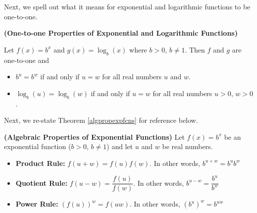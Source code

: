 \documentclass{ximera}
\begin{document}
\smallskip

Next, we spell out what it means for exponential and logarithmic functions to be one-to-one.

\smallskip

\colorbox{ResultColor}{\bbm

\begin{thm}  \label{explogsonetoone} \textbf{(One-to-one Properties of Exponential and Logarithmic Functions)} 

Let $f(x) = b^{x}$ and $g(x) = \log_{b}(x)$ where $b>0$, $b\neq 1$.  Then $f$ and $g$ are one-to-one and  

\vspace{-.1in}

\begin{itemize}

\item  $b^{u} = b^{w}$ if and only if $u=w$ for all real numbers $u$ and $w$.

\item  $\log_{b}(u) = \log_{b}(w)$ if and only if $u=w$ for all real numbers $u > 0$, $w > 0$.

\end{itemize}

\end{thm}

\ebm}

\smallskip


Next, we re-state Theorem \ref{algpropexpfcns} for reference below.

\smallskip

\colorbox{ResultColor}{\bbm

\begin{thm}  \textbf{(Algebraic Properties of Exponential Functions)}  Let $f(x) = b^{x}$ be an exponential function ($b > 0$, $b\neq 1$) and let $u$ and $w$ be real numbers. 

\begin{itemize}

\item  \textbf{Product Rule:}  $f(u+w) = f(u) f(w)$.  In other words, $b^{u+w} = b^{u} b^{w}$

\item  \textbf{Quotient Rule:}  $f(u-w) = \dfrac{f(u)}{f(w)}$.  In other words, $b^{u-w} = \dfrac{b^{u}}{b^{w}}$

\item  \textbf{Power Rule:}  $\left(f(u)\right)^w = f(uw)$.  In other words, $\left(b^{u}\right)^{w} = b^{uw}$

\end{itemize}

\end{thm}

\ebm}
\end{document}
